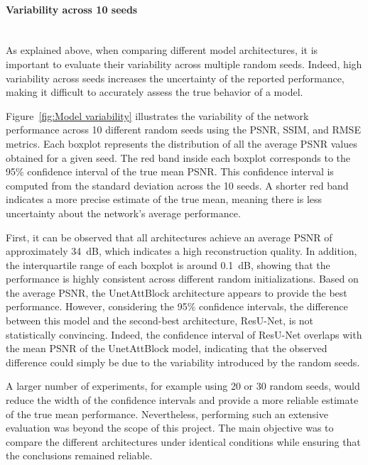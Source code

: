\documentclass[12pt]{article}
\begin{document}
\paragraph{Variability across 10 seeds}
\mbox{}\\

As explained above, when comparing different model architectures, it is important to evaluate their variability across multiple random seeds.
Indeed, high variability across seeds increases the uncertainty of the reported performance, making it difficult to accurately assess the true behavior of a model.
\vspace{0.5cm}

Figure~\ref{fig:Model variability} illustrates the variability of the network performance across 10 different random seeds using the PSNR, SSIM, and RMSE metrics.
Each boxplot represents the distribution of all the average PSNR values obtained for a given seed.
The red band inside each boxplot corresponds to the 95\% confidence interval of the true mean PSNR.
This confidence interval is computed from the standard deviation across the 10 seeds. 
A shorter red band indicates a more precise estimate of the true mean, meaning there is less uncertainty about the network's average performance.
\vspace{0.5cm}

First, it can be observed that all architectures achieve an average PSNR of approximately 34~dB, which indicates a high reconstruction quality. 
In addition, the interquartile range of each boxplot is around 0.1~dB, showing that the performance is highly consistent across different random initializations.
Based on the average PSNR, the UnetAttBlock architecture appears to provide the best performance.
However, considering the 95\% confidence intervals, the difference between this model and the second-best architecture, ResU-Net, is not statistically convincing.
Indeed, the confidence interval of ResU-Net overlaps with the mean PSNR of the UnetAttBlock model, indicating that the observed difference could simply be due to the variability introduced by the random seeds.
\vspace{0.5cm}

A larger number of experiments, for example using 20 or 30 random seeds, would reduce the width of the confidence intervals and provide a more reliable estimate of the true mean performance.
Nevertheless, performing such an extensive evaluation was beyond the scope of this project.
The main objective was to compare the different architectures under identical conditions while ensuring that the conclusions remained reliable.
\vspace{0.5cm}
\end{document}

